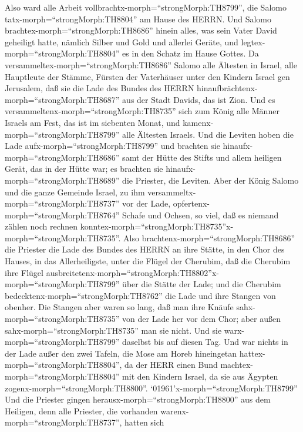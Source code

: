  Also ward alle Arbeit
vollbrachtx-morph=``strongMorph:TH8799'', die Salomo
tatx-morph=``strongMorph:TH8804'' am Hause des HERRN. Und Salomo
brachtex-morph=``strongMorph:TH8686'' hinein alles, was sein Vater David
geheiligt hatte, nämlich Silber und Gold und allerlei Geräte, und
legtex-morph=``strongMorph:TH8804'' es in den Schatz im Hause Gottes.
 Da versammeltex-morph=``strongMorph:TH8686'' Salomo alle
Ältesten in Israel, alle Hauptleute der Stämme, Fürsten der Vaterhäuser
unter den Kindern Israel gen Jerusalem, daß sie die Lade des Bundes des
HERRN hinaufbrächtenx-morph=``strongMorph:TH8687'' aus der Stadt Davids,
das ist Zion.  Und es
versammeltenx-morph=``strongMorph:TH8735'' sich zum König alle Männer
Israels am Fest, das ist im siebenten Monat,  und
kamenx-morph=``strongMorph:TH8799'' alle Ältesten Israels. Und die
Leviten hoben die Lade aufx-morph=``strongMorph:TH8799'' 
und brachten sie hinaufx-morph=``strongMorph:TH8686'' samt der Hütte des
Stifts und allem heiligen Gerät, das in der Hütte war; es brachten sie
hinaufx-morph=``strongMorph:TH8689'' die Priester, die Leviten.
 Aber der König Salomo und die ganze Gemeinde Israel, zu ihm
versammeltx-morph=``strongMorph:TH8737'' vor der Lade,
opfertenx-morph=``strongMorph:TH8764'' Schafe und Ochsen, so viel, daß
es niemand zählen noch rechnen
konntex-morph=``strongMorph:TH8735''x-morph=``strongMorph:TH8735''.
 Also brachtenx-morph=``strongMorph:TH8686'' die Priester
die Lade des Bundes des HERRN an ihre Stätte, in den Chor des Hauses, in
das Allerheiligste, unter die Flügel der Cherubim,  daß die
Cherubim ihre Flügel
ausbreitetenx-morph=``strongMorph:TH8802''x-morph=``strongMorph:TH8799''
über die Stätte der Lade; und die Cherubim
bedecktenx-morph=``strongMorph:TH8762'' die Lade und ihre Stangen von
obenher.  Die Stangen aber waren so lang, daß man ihre
Knäufe sahx-morph=``strongMorph:TH8735'' von der Lade her vor dem Chor;
aber außen sahx-morph=``strongMorph:TH8735'' man sie nicht. Und sie
warx-morph=``strongMorph:TH8799'' daselbst bis auf diesen Tag.
 Und war nichts in der Lade außer den zwei Tafeln, die Mose
am Horeb hineingetan hattex-morph=``strongMorph:TH8804'', da der HERR
einen Bund machtex-morph=``strongMorph:TH8804'' mit den Kindern Israel,
da sie aus Ägypten zogenx-morph=``strongMorph:TH8800''. 
`01961'\textbar x-morph=``strongMorph:TH8799'' Und die Priester gingen
herausx-morph=``strongMorph:TH8800'' aus dem Heiligen, denn alle
Priester, die vorhanden warenx-morph=``strongMorph:TH8737'', hatten sich
